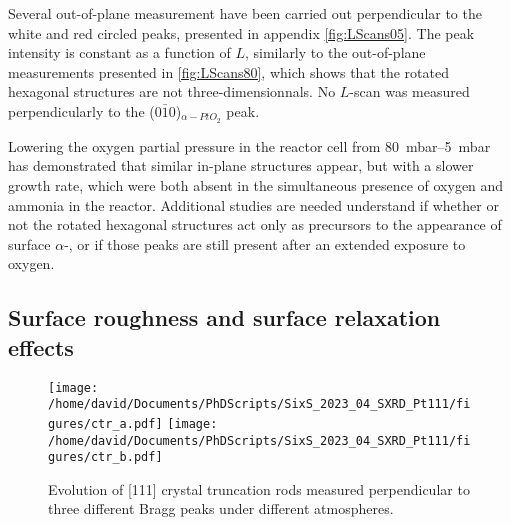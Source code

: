 Several out-of-plane measurement have been carried out perpendicular to the white and red circled peaks, presented in appendix \ref{fig:LScans05}.
The peak intensity is constant as a function of $L$, similarly to the out-of-plane measurements presented in \ref{fig:LScans80}, which shows that the rotated hexagonal structures are not three-dimensionnals.
No $L$-scan was measured perpendicularly to the ($0\bar{1}$0)$_{\alpha-PtO_2}$ peak.

Lowering the oxygen partial pressure in the reactor cell from \qtyrange{80}{5}{\milli\bar} has demonstrated that similar in-plane structures appear, but with a slower growth rate, which were both absent in the simultaneous presence of oxygen and ammonia in the reactor.
Additional studies are needed understand if whether or not the rotated hexagonal structures act only as precursors to the appearance of surface $\alpha$-, or if those peaks are still present after an extended exposure to oxygen.



\subsection{Surface roughness and surface relaxation effects}

\begin{figure}[!htb]
    \centering
    \texttt{[image: /home/david/Documents/PhDScripts/SixS\_2023\_04\_SXRD\_Pt111/figures/ctr\_a.pdf]}
    \texttt{[image: /home/david/Documents/PhDScripts/SixS\_2023\_04\_SXRD\_Pt111/figures/ctr\_b.pdf]}
    \caption{
        Evolution of [111] crystal truncation rods measured perpendicular to three different Bragg peaks under different atmospheres.
    }
    \label{fig:CTRPt111}
\end{figure}

